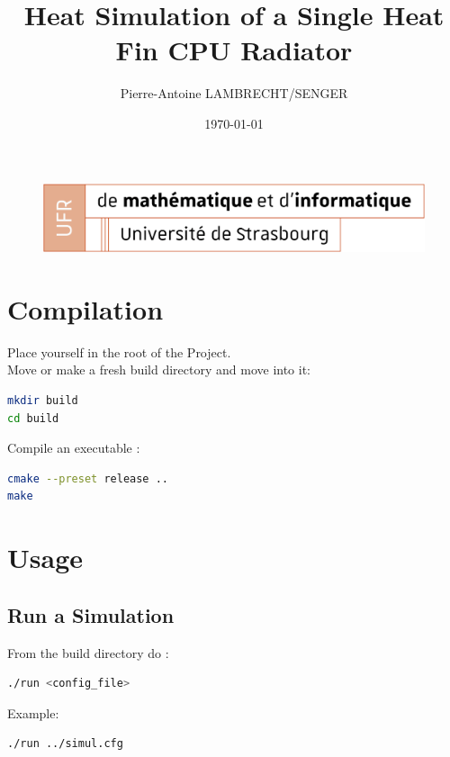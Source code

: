 \documentclass{article}
\begin{document}
\title{Heat Simulation of a Single Heat Fin CPU Radiator}
\author{Pierre-Antoine LAMBRECHT/SENGER}
\date{\today}

\maketitle

\vspace{30pt} %

\begin{figure}[H]
    \centering
    \includegraphics[width=1\linewidth]{image.png}   
\end{figure}

\vspace{30pt} %

\tableofcontents
\newpage

\section{Compilation}
Place yourself in the root of the Project.  \\ 
Move or make a fresh build directory and move into it:
\begin{lstlisting}[language=bash]
mkdir build
cd build
\end{lstlisting}
Compile an executable :
\begin{lstlisting}[language=bash]
cmake --preset release ..
make
\end{lstlisting}

\section{Usage}

\subsection{Run a Simulation}
From the build directory do :
\begin{lstlisting}[language=bash]
./run <config_file>
\end{lstlisting}

Example:
\begin{lstlisting}[language=bash]
./run ../simul.cfg
\end{lstlisting} 
\end{document}
